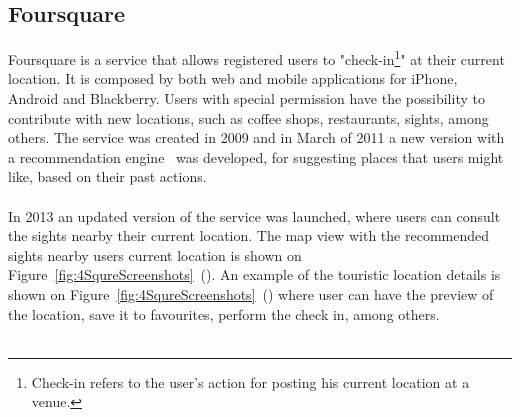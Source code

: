 \subsection{Foursquare}
Foursquare is a service that allows registered users to "check-in\footnote{Check-in refers to the user's action for posting his current location at a venue.}" at their current location. It is composed by both web and mobile applications for iPhone, Android and Blackberry. Users with special permission have the possibility to contribute with new locations, such as coffee shops, restaurants, sights, among others. The service was created in 2009 and in March of 2011 a new version with a recommendation engine~\cite{foursqureRecommendationEngine} was developed, for suggesting places that users might like, based on their past actions.\\
\\
In 2013 an updated version of the service was launched, where users can consult the sights nearby their current location. The map view with the recommended sights nearby users current location is shown on Figure~\ref{fig:4SqureScreenshots}~(). An example of the touristic location details is shown on Figure~\ref{fig:4SqureScreenshots}~() where user can have the preview of the location, save it to favourites, perform the check in, among others.\\
\\
